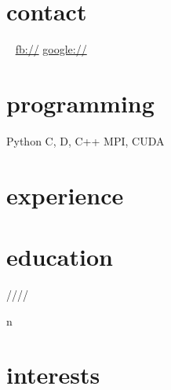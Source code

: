 \documentclass[]{fancy-cv}
\begin{document}
\header{\MakeLowercase\myfirstname}{\MakeLowercase\mylastname}

\begin{aside}
  \section{contact}
    \myphone
    \myaddress
    \mycity
    ~
    \href{mailto:\myemail}{\myemail}
    \href{\mywebsite}{\mywebsite}
    \href{http://facebook.com/\myfb}{fb://\myfb}
    \href{http://plug.google.com/\mygp}{google://\mygp}
  \section{programming}
    Python
    C, D, C++
    MPI, CUDA
\end{aside}

\section{experience}
\label{sec:experience}


\vspace{-1.5em}

\section{education}
\label{sec:education}

\begin{entrylist}
 \year/\degree/\school/\city/\subtitle in \education {
  \entry{\year}{\degree}{\school}{\subtitle}
}
\end{entrylist}

\section{interests}
\MakeLowercase\interests
\end{document}
